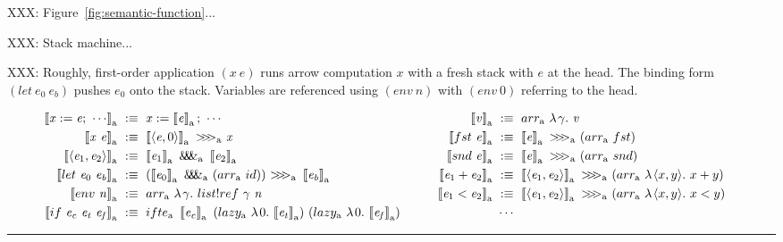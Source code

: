 \documentclass[preprint]{sigplanconf}
\newcommand{\arrow}{\rightsquigarrow}
\newcommand{\arrowarr}{\ensuremath{arr}}
\newcommand{\arrowcomp}{\ensuremath{{>}\mspace{-6mu}{>}\mspace{-6mu}{>}}}
\newcommand{\arrowpair}{\ensuremath{\mathit{\&\mspace{-7.5mu}\&\mspace{-7.5mu}\&}}}
\newcommand{\arrowif}{\ensuremath{ifte}}
\newcommand{\arrowlazy}{\ensuremath{lazy}}
\newcommand{\gen}{_\mathrm{a}}
\begin{document}
XXX: Figure~\ref{fig:semantic-function}...

XXX: Stack machine...

XXX: Roughly, first-order application $(\mathit{x~e})$ runs arrow computation $\mathit{x}$ with a fresh stack with $\mathit{e}$ at the head.
The binding form $(let~\mathit{e}_0~\mathit{e_b})$ pushes $\mathit{e}_0$ onto the stack.
Variables are referenced using $(env~\mathit{n})$ with $(env~0)$ referring to the head.

\begin{figure*}[t]\centering
\begin{align*}
\begin{aligned}[t]
	\meaningof{\mathit{x} := \mathit{e};\ \cdots}\gen &\ :\equiv\
		\mathit{x} := \meaningof{\mathit{e}}\gen;\ \cdots \\
	\meaningof{\mathit{x}~\mathit{e}}\gen &\ :\equiv\
		\meaningof{\pair{\mathit{e},0}}\gen~\arrowcomp\gen~\mathit{x}
\\
	\meaningof{\pair{\mathit{e}_1,\mathit{e}_2}}\gen &\ :\equiv\
		\meaningof{\mathit{e}_1}\gen~\arrowpair\gen~\meaningof{\mathit{e}_2}\gen
\\
	\meaningof{let~\mathit{e}_0~\mathit{e_b}}\gen &\ :\equiv\ 
		(\meaningof{\mathit{e}_0}\gen~\arrowpair\gen~(\arrowarr\gen~id))~
			\arrowcomp\gen~
		\meaningof{\mathit{e_b}}\gen
\\
	\meaningof{env~\mathit{n}}\gen &\ :\equiv\ \arrowarr\gen~\fun{\gamma}{list!ref~\gamma~\mathit{n}}
\\
	\meaningof{if~\mathit{e_c}~\mathit{e_t}~\mathit{e_f}}\gen &\ :\equiv\
		\arrowif\gen~
			\meaningof{\mathit{e_c}}\gen~
			(\arrowlazy\gen~\fun{0}{\meaningof{\mathit{e_t}}\gen})~
			(\arrowlazy\gen~\fun{0}{\meaningof{\mathit{e_f}}\gen})
\\
\end{aligned}
&\tab\tab\tab
\begin{aligned}[t]
	\meaningof{\mathit{v}}\gen &\ :\equiv\ \arrowarr\gen~\fun{\gamma}{\mathit{v}}
\\
	\meaningof{fst~\mathit{e}}\gen &\ :\equiv\
		\meaningof{\mathit{e}}\gen~\arrowcomp\gen~(\arrowarr\gen~fst)
\\
	\meaningof{snd~\mathit{e}}\gen &\ :\equiv\
		\meaningof{\mathit{e}}\gen~\arrowcomp\gen~(\arrowarr\gen~snd)
\\
	\meaningof{\mathit{e}_1 + \mathit{e}_2}\gen &\ :\equiv\
		\meaningof{\pair{\mathit{e}_1,\mathit{e}_2}}\gen~\arrowcomp\gen~(\arrowarr\gen~\fun{\pair{x,y}}{x + y})
\\
	\meaningof{\mathit{e}_1 < \mathit{e}_2}\gen &\ :\equiv\
		\meaningof{\pair{\mathit{e}_1,\mathit{e}_2}}\gen~\arrowcomp\gen~(\arrowarr\gen~\fun{\pair{x,y}}{x < y})
\\
	&\ \cdots\ 
\\
\end{aligned}
\end{align*}
\hrule
\caption{Transformation from a let-calculus with first-order definitions and De-Bruijn-indexed bindings to computations in arrow $\mathrm{a}$.
}
\label{fig:semantic-function}
\end{figure*}
\end{document}
